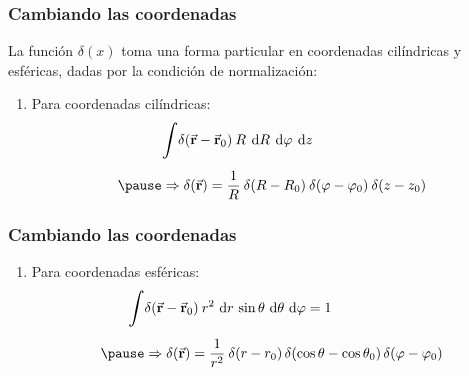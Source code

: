 \documentclass[12pt]{beamer}
\begin{document}
\begin{frame}
\frametitle{Cambiando las coordenadas}
La función $\delta (x)$ toma una forma particular en coordenadas cilíndricas y esféricas, dadas por la condición de normalización:
\pause
{}
\begin{enumerate}[<+->]
\item Para coordenadas cilíndricas:
\begin{eqnarray*}
\begin{aligned}
&\scaleint{6ex} \delta (\va{r} - \va{r}_{0}) \: R \: \dd{R} \: \dd{\varphi} \: \dd{z} \\[0.5em] \pause 
&\Rightarrow \delta (\va{r}) =  \dfrac{1}{R} \: \delta (R - R_{0}) \: \delta (\varphi - \varphi_{0}) \: \delta (z - z_{0})
\end{aligned}
\end{eqnarray*}
\seti
\end{enumerate}
\end{frame}
\begin{frame}
\frametitle{Cambiando las coordenadas}
\begin{enumerate}[<+->]
\conti
\item Para coordenadas esféricas:
\begin{eqnarray*}
\begin{aligned}
\scaleint{6ex} & \delta (\va{r} - \va{r}_{0}) \: r^{2} \, \dd{r} \, \sin \theta \, \dd{\theta} \, \dd{\varphi} = 1 \\[0.5em] \pause
&\Rightarrow \delta (\va{r}) = \dfrac{1}{r^{2}} \: \delta (r - r_{0}) \, \delta (\cos \theta - \cos \theta_{0}) \, \delta (\varphi - \varphi_{0})
\end{aligned}
\end{eqnarray*}
\end{enumerate}
\end{frame}
\end{document}
